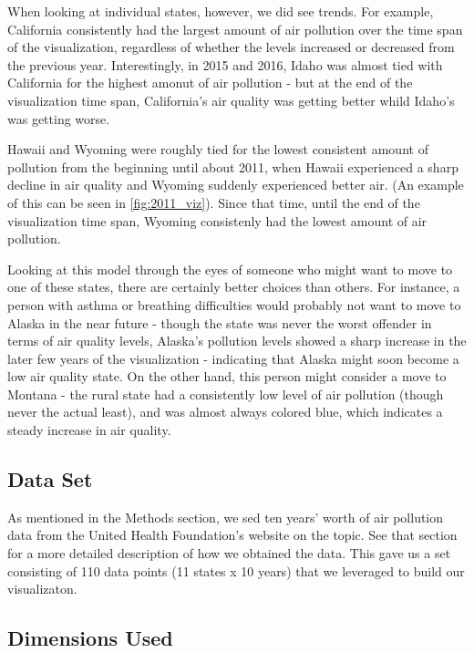 \documentclass[journal]{vgtc}                %
\begin{document}
When looking at individual states, however, we did see trends. For example, California consistently had the largest amount of air
pollution over the time span of the visualization, regardless of whether the levels increased or decreased from the previous year.
Interestingly, in 2015 and 2016, Idaho was almost tied with California for the highest amonut of air pollution - but at the end
of the visualization time span, California's air quality was getting better whild Idaho's was getting worse.

Hawaii and Wyoming were roughly tied for the lowest consistent amount of pollution from the beginning until about 2011, when Hawaii
experienced a sharp decline in air quality and Wyoming suddenly experienced better air. (An example of this can be seen in \ref{fig:2011_viz}).
Since that time, until the end of the visualization time span, Wyoming consistenly had the lowest amount of air pollution. 

Looking at this model through the eyes of someone who might want to move to one of these states, there are certainly better choices than 
others. For instance, a person with asthma or breathing difficulties would probably not want to move to Alaska in the near future - though
the state was never the worst offender in terms of air quality levels, Alaska's pollution levels showed a sharp increase in the later few
years of the visualization - indicating that Alaska might soon become a low air quality state. On the other hand, this person might consider
a move to Montana - the rural state had a consistently low level of air pollution (though never the actual least), and was almost always
colored blue, which indicates a steady increase in air quality.

\subsection{Data Set}

As mentioned in the Methods section, we sed ten years' worth of air pollution data from the United Health Foundation's
website on the topic. See that section for a more detailed description of how we obtained the data. 
This gave us a set consisting of 110 data points (11 states x 10 years) that we leveraged to build our visualizaton. 

\subsection{Dimensions Used}
\end{document}
